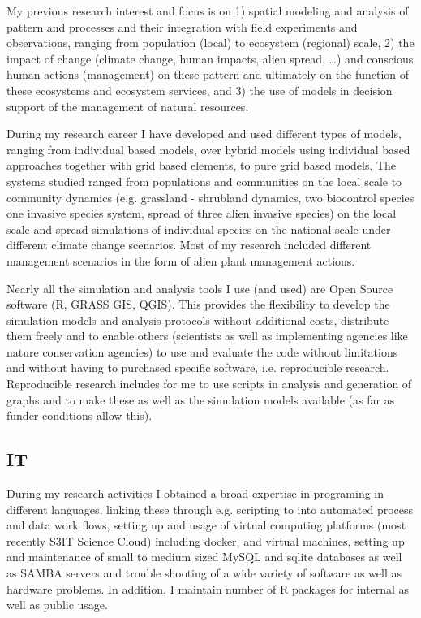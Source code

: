 \documentclass[a4paper]{article}
\begin{document}
My previous research interest and focus is on 1) spatial modeling and analysis of pattern and processes and their integration with field experiments and observations, ranging from population (local) to ecosystem (regional) scale, 2) the impact of change (climate change, human impacts, alien spread, \ldots{}) and conscious human actions (management) on these pattern and ultimately on the function of these ecosystems and ecosystem services, and 3) the use of models in decision support of the management of natural resources.

During my research career I have developed and used different types of models, ranging from individual based models, over hybrid models using individual based approaches together with grid based elements, to pure grid based models. The systems studied ranged from populations and communities on the local scale to community dynamics (e.g. grassland - shrubland dynamics, two biocontrol species one invasive species system, spread of three alien invasive species) on the local scale and spread simulations of individual species on the national scale under different climate change scenarios. Most of my research included different management scenarios in the form of alien plant management actions.

Nearly all the simulation and analysis tools I use (and used) are Open Source software (R, GRASS GIS, QGIS). This provides the flexibility to develop the simulation models and analysis protocols without additional costs, distribute them freely and to enable others (scientists as well as implementing agencies like nature conservation agencies) to use and evaluate the code without limitations and without having to purchased specific software, i.e. reproducible research. Reproducible research includes for me to use scripts in analysis and generation of graphs and to make these as well as the simulation models available (as far as funder conditions allow this).

\subsection{IT}

During my research activities I obtained a broad expertise in programing in different languages, linking these through e.g. scripting to into automated process and data work flows, setting up and usage of virtual computing platforms (most recently S3IT Science Cloud) including docker, and virtual machines, setting up and maintenance of small to medium sized MySQL and sqlite databases as well as SAMBA servers and trouble shooting of a wide variety of software as well as hardware problems. In addition, I maintain number of R packages for internal as well as public usage.  
\end{document}
